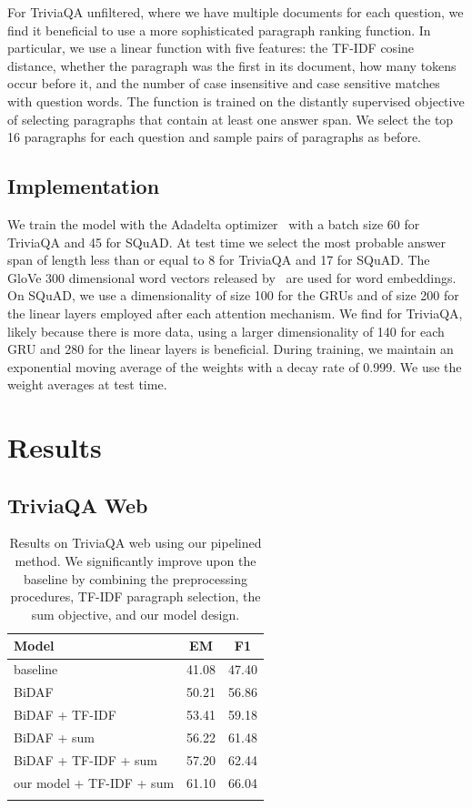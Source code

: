 \documentclass[11pt,a4paper]{article}
\begin{document}
For TriviaQA unfiltered, where we have multiple documents for each question, we find it beneficial to use a more sophisticated paragraph ranking function. In particular, we use a linear function with five features: the TF-IDF cosine distance, whether the paragraph was the first in its document, how many tokens occur before it, and the number of case insensitive and case sensitive matches with question words. The function is trained on the distantly supervised objective of selecting paragraphs that contain at least one answer span. We select the top 16 paragraphs for each question and sample pairs of paragraphs as before.

\subsection{Implementation}
We train the model with the Adadelta optimizer~\cite{zeiler2012adadelta} with a batch size 60 for TriviaQA and 45 for SQuAD. At test time we select the most probable answer span of length less than or equal to 8 for TriviaQA and 17 for SQuAD. The GloVe 300 dimensional word vectors released by~\citet{pennington2014glove} are used for word embeddings. On SQuAD, we use a dimensionality of size 100 for the GRUs and of size 200 for the linear layers employed after each attention mechanism. We find for TriviaQA, likely because there is more data, using a larger dimensionality of 140 for each GRU and 280 for the linear layers is beneficial. During training, we maintain an exponential moving average of the weights with a decay rate of 0.999. We use the weight averages at test time.

\section{Results}
\label{sect:experiments}

\subsection{TriviaQA Web}
\setlength\doublerulesep{.8pt}

\begin{table}

\center
\begin{tabular}{l c c}
\hhline{===}
Model & EM & F1 \\ \hline
baseline~\cite{triviaqa} & 41.08 & 47.40 \\ 
BiDAF & 50.21 & 56.86\\ 
BiDAF + TF-IDF & 53.41 & 59.18\\ 
BiDAF + sum & 56.22 & 61.48\\ 
BiDAF + TF-IDF + sum & 57.20 & 62.44\\ 
our model + TF-IDF + sum & 61.10 & 66.04\\ 
\hhline{===}
\end{tabular}
\caption{Results on TriviaQA web using our pipelined method. We significantly improve upon the baseline by combining the preprocessing procedures, TF-IDF paragraph selection, the sum objective, and our model design.}
\label{table:bidaf-ablate}
\end{table}
\end{document}

